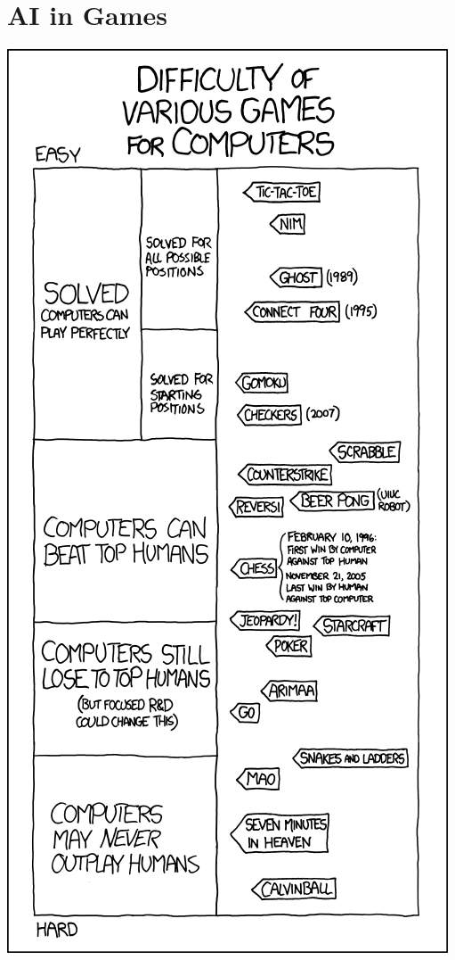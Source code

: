 \documentclass{beamer}
\begin{document}
  \section{AI in Games}
  \begin{frame}[standout]
    \includegraphics[height=\paperheight]{../img/game_AIs.png}
    \nocite{xkcdGameAIs}
  \end{frame}
\end{document}
